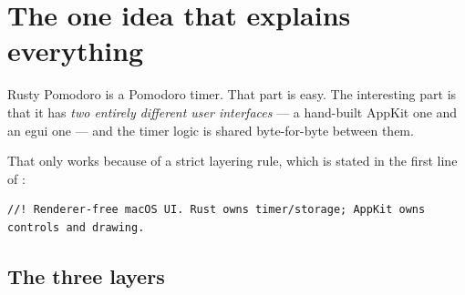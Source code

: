 \section{The one idea that explains everything}

Rusty Pomodoro is a Pomodoro timer. That part is easy. The interesting part is that it has
\emph{two entirely different user interfaces} --- a hand-built AppKit one and an egui
one --- and the timer logic is shared byte-for-byte between them.

That only works because of a strict layering rule, which is stated in the first line of
:

\begin{lstlisting}[caption={The module's own doc comment states the contract.}]
//! Renderer-free macOS UI. Rust owns timer/storage; AppKit owns controls and drawing.
\end{lstlisting}

\subsection{The three layers}

